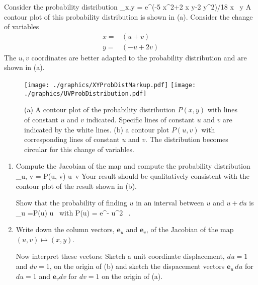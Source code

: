 \documentclass[12pt]{article}
\begin{document}
     Consider the probability distribution 
       \st
 \dd \Pscr_{x,y}  =  e^{\left(-5 x^2+2 x y-2 y^2\right)/18} \dd x \, \dd y
       \stp
       A contour plot of this probability distribution is shown in (a).
       Consider the change of variables
       \begin{align}
          x =&  \left( u + v \right)  \\
          y =&  \left( -u + 2 v \right) 
       \end{align}
       The $u,v$ coordinates are better adapted to the probability distribution and are shown in (a).
    \begin{figure}
 \centering
 \texttt{[image: ./graphics/XYProbDistMarkup.pdf]}
 \texttt{[image: ./graphics/UVProbDistribution.pdf]}
    \caption{ \label{coords} 
       (a) A contour plot of the probability distribution $P(x,y)$ with lines of constant $u$ and $v$ indicated. Specific lines of constant $u$ and $v$ 
       are indicated by the white lines. (b) a contour plot $P(u,v)$ with corresponding lines  of constant $u$ and $v$. The distribution becomes circular for this change of variables. }
       \end{figure}

       \begin{enumerate}[resume]
          \item Compute the Jacobian of the map and compute the probability distribution
       \st
         \dd \Pscr_{u, v} = P(u, v) \dd u\, \dd v
       \stp
       Your result should be qualitatively consistent with the contour plot of the result shown in (b).

      Show that the probability of finding $u$ in an interval between $u$ and $u+ \dd u$ is 
       \st
        \dd \Pscr_{u} =P(u) \dd u \, \quad \mbox{with} \quad     P(u) =  e^{- u^2}  \, .
       \stp

    \item Write down the column vectors, 
       ${\bm e}_u$ and ${\bm e}_v$, of the Jacobian of the map $(u,v) \mapsto (x,y)$.

       Now interpret these vectors: Sketch a unit coordinate displacement,  $du=1$ and $dv=1$,  on the origin of (b) and sketch the dispacement vectors ${\bm e}_u \, du$  for $du=1$ and 
       ${\bm e}_v dv$ for $dv = 1$ on the origin of (a).
       \end{enumerate}
\end{document}

